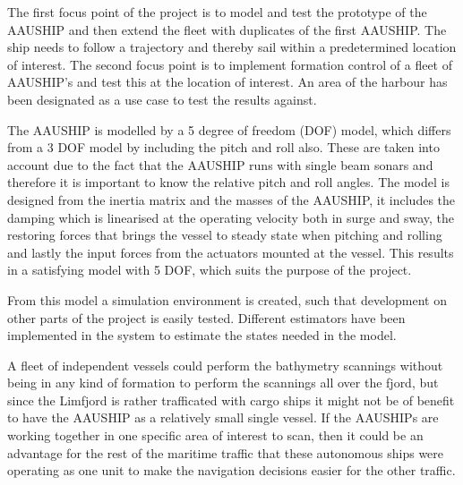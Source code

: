 \documentclass[a4paper,12pt]{article}
\begin{document}
The first focus point of the project is to model and test the
prototype of the AAUSHIP and then extend the fleet with duplicates of
the first AAUSHIP. The ship needs to follow a trajectory and thereby
sail within a predetermined location of interest. The second focus
point is to implement formation control of a fleet of AAUSHIP's and
test this at the location of interest. An area of the harbour has been
designated as a use case to test the results against.

The AAUSHIP is modelled by a 5 degree of freedom (DOF) model, which
differs from a 3 DOF model by including the pitch and roll also.
These are taken into account due to the fact that the AAUSHIP runs
with single beam sonars and therefore it is important to know the
relative pitch and roll angles. The model is designed from the inertia
matrix and the masses of the AAUSHIP, it includes the damping which is
linearised at the operating velocity both in surge and sway, the
restoring forces that brings the vessel to steady state when pitching
and rolling and lastly the input forces from the actuators mounted at
the vessel. This results in a satisfying model with 5 DOF, which suits
the purpose of the project.

From this model a simulation environment is created, such that
development on other parts of the project is easily tested.  Different
estimators have been implemented in the system to estimate the states
needed in the model.


A fleet of independent vessels could perform the bathymetry scannings
without being in any kind of formation to perform the scannings all
over the fjord, but since the Limfjord is rather trafficated with cargo
ships it might not be of benefit to have the AAUSHIP as a relatively
small single vessel. If the AAUSHIPs are working together in one
specific area of interest to scan, then it could be an advantage for
the rest of the maritime traffic that these autonomous ships were
operating as one unit to make the navigation decisions easier for the
other traffic.
\end{document}
